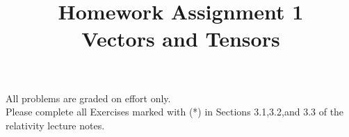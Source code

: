 \documentclass[12pt]{article}
\begin{document}
\date{\vspace{-5ex}}

\title{Homework Assignment 1 \\ Vectors and Tensors}

\maketitle

\noindent
All problems are graded on effort only.\\

\noindent
Please complete all Exercises marked with (*) in Sections 3.1,3.2,and 3.3 of the relativity lecture notes.\\
\end{document}
